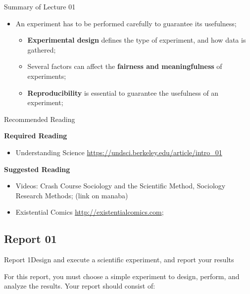 \documentclass{beamer}
\begin{document}
\begin{CJK}{UTF8}{ipxm}
\begin{frame}{Summary of Lecture 01}
\begin{itemize}
    \item An experiment has to be performed carefully to guarantee its usefulness;
    \begin{itemize}
      \item {\bf Experimental design} defines the type of experiment, and how data is gathered;
      \item Several factors can affect the {\bf fairness and meaningfulness} of experiments;
      \item {\bf Reproducibility} is essential to guarantee the usefulness of an experiment;
    \end{itemize}
  \end{itemize}

\end{frame}

\begin{frame}{Recommended Reading}

  {\bf Required Reading}
  \begin{itemize}
    \item Understanding Science \url{https://undsci.berkeley.edu/article/intro_01}
  \end{itemize}
  \bigskip

  {\bf Suggested Reading}
  \begin{itemize}
    \item Videos: Crash Course Sociology and the Scientific Method, Sociology Research Methods; (link on manaba)
    \item Existential Comics \url{http://existentialcomics.com};
  \end{itemize}
\end{frame}

\subsection{Report 01}
\begin{frame}{Report 1}{Design and execute a scientific experiment, and report your results}

  For this report, you must choose a simple experiment to design, perform, and analyze the results. Your report should consist of:\medskip


\end{frame}
\end{CJK}
\end{document}

